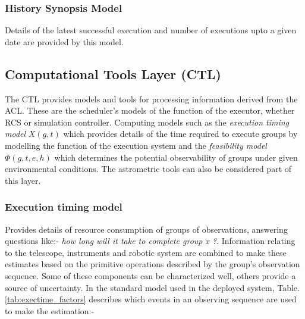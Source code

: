 \subsubsection{History Synopsis Model}
Details of the latest successful execution and number of executions upto a given date are provided by this model.

\subsection{Computational Tools Layer (CTL)}
The CTL provides models and tools for processing information derived from the ACL. These are the scheduler's models of the function of the executor, whether RCS or simulation controller. Computing models such as the \emph{execution timing model} $X(g,t)$ which provides details of the time required to execute groups by modelling the function of the execution system and the \emph{feasibility model} $\Phi(g,t,e,h)$ which determines the potential observability of groups under given environmental conditions. The astrometric tools can also be considered part of this layer.

\subsubsection{Execution timing model}
\label{sect:sub_xtm}
Provides details of resource consumption of groups of observations, answering questions like:- \emph{how long will it take to complete group x ?}. Information relating to the telescope, instruments and robotic system are combined to make these estimates based on the primitive operations described by the group's observation sequence. Some of these components can be characterized well, others provide a source of uncertainty. In the standard model used in the deployed system, Table.~ \ref{tab:exectime_factors} describes which events in an observing sequence are used to make the estimation:-


